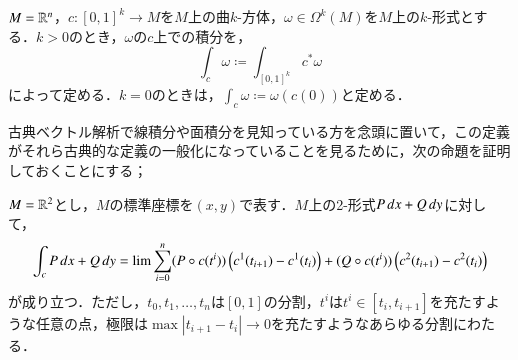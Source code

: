 \begin{defi}
$M=\mathbb{R}^n$，$c \colon [0,1]^k \to M$を$M$上の曲$k$-方体，$\omega \in \Omega^k(M)$を$M$上の$k$-形式とする．$k > 0$のとき，$\omega$の$c$上での積分を，
\begin{equation}
\int_c \omega \coloneqq \int_{[0,1]^k} c^* \omega
\end{equation}によって定める．$k=0$のときは，$\int_c \omega \coloneqq \omega(c(0))$と定める．
\end{defi}

古典ベクトル解析で線積分や面積分を見知っている方を念頭に置いて，この定義がそれら古典的な定義の一般化になっていることを見るために，次の命題を証明しておくことにする；

\begin{prop}
$M=\mathbb{R}^2$とし，$M$の標準座標を$(x,y)$で表す．$M$上の2-形式$P \mathop{}\!d x+ Q \mathop{}\!d y$に対して，
\begin{equation}
\int_c P \mathop{}\!d x + Q \mathop{}\!d y = \lim \sum_{i=0}^n (P \circ c(t^i)) \left(c^1(t_{i+1}) - c^1(t_{i})\right) + (Q \circ c(t^i)) \left(c^2(t_{i+1}) - c^2(t_{i})\right)
\end{equation}が成り立つ．ただし，$t_0, t_1, \dots, t_n$は$[0,1]$の分割，$t^i$は$t^i \in [t_i, t_{i+1}]$を充たすような任意の点，極限は$\max |t_{i+1} - t_i| \to 0$を充たすようなあらゆる分割にわたる．
\end{prop}

